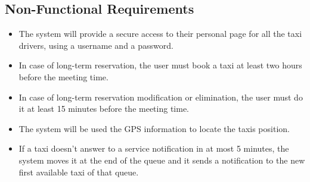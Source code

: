 	\subsection{Non-Functional Requirements}
		\begin{itemize}
		\item The system will provide a secure access to their personal page for all the taxi drivers, using a username and a password.
		\item In case of long-term reservation, the user must book a taxi at least two hours before the meeting time.
		\item In case of long-term reservation modification or elimination, the user must do it at least 15 minutes before the meeting time.
	    \item The system will be used the GPS information to locate the taxis position.
	    \item If a taxi doesn't answer to a service notification in at most 5 minutes, the system moves it at the end of the queue and it sends a notification to the new first available taxi of that queue. 
		\end{itemize}
